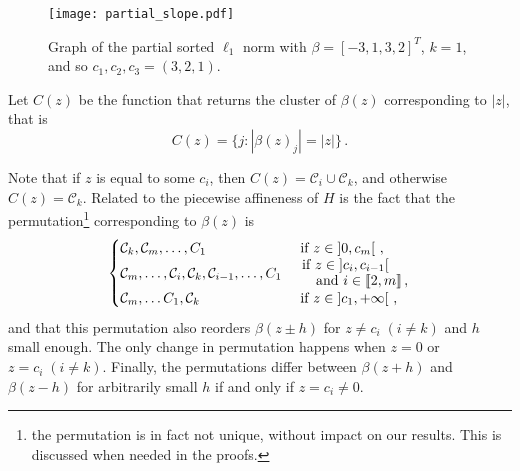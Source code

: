 \begin{figure}[htbp]
  \centering
  \texttt{[image: partial\_slope.pdf]}
  \caption{Graph of the partial sorted $\ell_1$ norm with \(\beta = [-3, 1, 3, 2]^T\), \(k = 1\), and so $c_1, c_2, c_3 = (3, 2, 1)$.}
  \label{fig:partial_slope}
\end{figure}

Let \(C(z)\) be the function that returns the cluster of $\beta(z)$ corresponding to \(|z|\), that is
\begin{equation}
  C(z) = \{j : |\beta(z)_j| = |z|\} \,.
\end{equation}

\begin{remark}\label{rem:permutation_C_z}
  Note that if $z$ is equal to some $c_i$, then $C(z) = \mathcal{C}_i \cup \mathcal{C}_k$, and otherwise $C(z) = \mathcal{C}_k$.
  Related to the piecewise affineness of $H$ is the fact that the permutation\footnote{the permutation is in fact not unique, without impact on our results. This is discussed when needed in the proofs.} corresponding to $\beta(z)$ is
  \begin{equation*}
    \begin{cases}
      \cC_k, \cC_m, \ldots, C_1
       & \text{ if } z \in \left]0, c_m\right[ \, ,                                                                     \\
      \cC_m, \ldots ,\cC_i, \cC_k, \cC_{i-1}, \ldots, C_1
       & \splitfrac{\text{ if } z \in \left]c_{i}, c_{i-1} \right[}{\text{ and } i \in \llbracket 2 , m \rrbracket\, ,} \\
      \cC_m, \ldots C_1,  \cC_k
       & \text{ if } z \in \left]c_1, +\infty \right[ \, ,                                                              \\
    \end{cases}
  \end{equation*}
  and that this permutation also reorders $\beta(z \pm h)$ for $z \neq c_i \; (i \neq k)$ and $h$ small enough.
  The only change in permutation happens when $z = 0$ or $z = c_i \; (i \neq k)$.
  Finally, the permutations differ between $\beta(z + h)$ and $\beta(z - h)$ for arbitrarily small $h$ if and only if $z = c_i \neq 0$.
\end{remark}

